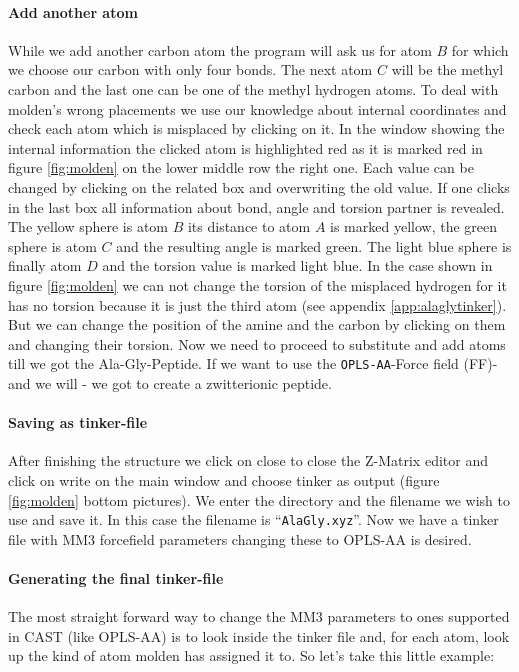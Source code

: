 \documentclass[a4paper,11pt]{scrartcl}
\begin{document}
\paragraph{Add another atom}While we add another carbon atom the program will ask us for atom $B$ for which we choose our carbon with only four bonds. The next atom $C$ will be the methyl carbon and the last one can be one of the methyl hydrogen atoms. To deal with molden's wrong placements we use our knowledge about internal coordinates and check each atom which is misplaced by clicking on it. In the window showing the internal information the clicked atom is highlighted red as it is marked red in figure \ref{fig:molden} on the lower middle row the right one. Each value can be changed by clicking on the related box and overwriting the old value. If one clicks in the last box all information about bond, angle and torsion partner is revealed. The yellow sphere is atom $B$ its distance to atom $A$ is marked yellow, the green sphere is atom $C$ and the resulting angle is marked green. The light blue sphere is finally atom $D$ and the torsion value is marked light blue. In the case shown in figure \ref{fig:molden} we can not change the torsion of the misplaced hydrogen for it has no torsion because it is just the third atom (see appendix \ref{app:alaglytinker}). But we can change the position of the amine and the carbon by clicking on them and changing their torsion. Now we need to proceed to substitute and add atoms till we got the Ala-Gly-Peptide. If we want to use the \texttt{OPLS-AA}-Force field (FF)- and we will - we got to create a zwitterionic peptide.
\paragraph{Saving as tinker-file}After finishing the structure we click on close to close the Z-Matrix editor and click on write on the main window and choose tinker as output (figure \ref{fig:molden} bottom pictures). We enter the directory and the filename we wish to use and save it. In this case the filename is ``\texttt{AlaGly.xyz}''. Now we have a tinker file with MM3 forcefield parameters changing these to OPLS-AA is desired.
\paragraph{Generating the final tinker-file}The most straight forward way to change the MM3 parameters to ones supported in CAST (like OPLS-AA) is to look inside the tinker file and, for each atom, look up the kind of atom molden has assigned it to. So let's take this little example:
\end{document}
